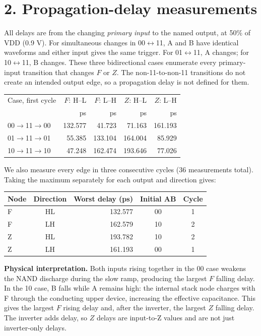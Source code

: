 \documentclass[11pt,a4paper]{article}
\begin{document}
\section*{2. Propagation-delay measurements}
All delays are from the changing \emph{primary input} to the named output, at 50\% of VDD (0.9 V). For simultaneous changes in 00$\leftrightarrow$11, A and B have identical waveforms and either input gives the same trigger. For 01$\leftrightarrow$11, A changes; for 10$\leftrightarrow$11, B changes.
These three bidirectional cases enumerate every primary-input transition that changes $F$ or $Z$. The non-11-to-non-11 transitions do not create an intended output edge, so a propagation delay is not defined for them.
\begin{center}\begin{tabular}{lrrrr}\toprule
Case, first cycle&$F$: H--L&$F$: L--H&$Z$: H--L&$Z$: L--H\\
&ps&ps&ps&ps\\\midrule
00$\to$11$\to$00&132.577&41.723&71.163&161.193\\
01$\to$11$\to$01&55.385&133.104&164.004&85.929\\
10$\to$11$\to$10&47.248&162.474&193.646&77.026\\
\bottomrule\end{tabular}\end{center}
We also measure every edge in three consecutive cycles (36 measurements total). Taking the maximum separately for each output and direction gives:
\begin{center}\begin{tabular}{lcrcc}\toprule
Node&Direction&Worst delay (ps)&Initial AB&Cycle\\\midrule
F&HL&132.577&00&1\\
F&LH&162.579&10&2\\
Z&HL&193.782&10&2\\
Z&LH&161.193&00&1\\
\bottomrule\end{tabular}\end{center}
\textbf{Physical interpretation.} Both inputs rising together in the 00 case weakens the NAND discharge during the slow ramp, producing the largest $F$ falling delay. In the 10 case, B falls while A remains high: the internal stack node charges with F through the conducting upper device, increasing the effective capacitance. This gives the largest $F$ rising delay and, after the inverter, the largest $Z$ falling delay. The inverter adds delay, so $Z$ delays are input-to-Z values and are not just inverter-only delays.
\end{document}
